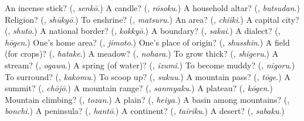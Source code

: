 \begin{tcolorbox}[breakable,colback=teal!4,colframe=teal!35!black,title={Before you move on}]
An incense stick? (\textbf{}, \emph{senkō}.) A candle? (\textbf{}, \emph{rōsoku}.) A household altar? (\textbf{}, \emph{butsudan}.) Religion? (\textbf{}, \emph{shūkyō}.) To enshrine? (\textbf{}, \emph{matsuru}.) An area? (\textbf{}, \emph{chiiki}.) A capital city? (\textbf{}, \emph{shuto}.) A national border? (\textbf{}, \emph{kokkyō}.) A boundary? (\textbf{}, \emph{sakai}.) A dialect? (\textbf{}, \emph{hōgen}.) One's home area? (\textbf{}, \emph{jimoto}.) One's place of origin? (\textbf{}, \emph{shusshin}.) A field (for crops)? (\textbf{}, \emph{hatake}.) A meadow? (\textbf{}, \emph{nohara}.) To grow thick? (\textbf{}, \emph{shigeru}.) A stream? (\textbf{}, \emph{ogawa}.) A spring (of water)? (\textbf{}, \emph{izumi}.) To become muddy? (\textbf{}, \emph{nigoru}.) To surround? (\textbf{}, \emph{kakomu}.) To scoop up? (\textbf{}, \emph{sukuu}.) A mountain pass? (\textbf{}, \emph{tōge}.) A summit? (\textbf{}, \emph{chōjō}.) A mountain range? (\textbf{}, \emph{sanmyaku}.) A plateau? (\textbf{}, \emph{kōgen}.) Mountain climbing? (\textbf{}, \emph{tozan}.) A plain? (\textbf{}, \emph{heiya}.) A basin among mountains? (\textbf{}, \emph{bonchi}.) A peninsula? (\textbf{}, \emph{hantō}.) A continent? (\textbf{}, \emph{tairiku}.) A desert? (\textbf{}, \emph{sabaku}.)
\end{tcolorbox}
